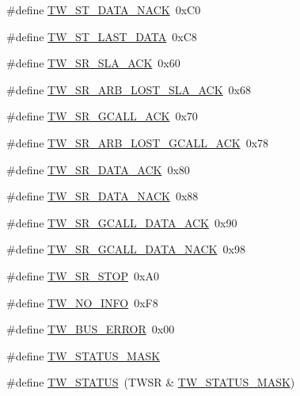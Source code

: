 \begin{DoxyCompactItemize}
\item 
\#define \hyperlink{group__util__twi_gacc1837317b1d45e9bb49b8e83cfe6d42}{T\+W\+\_\+\+S\+T\+\_\+\+D\+A\+T\+A\+\_\+\+N\+A\+CK}~0x\+C0
\item 
\#define \hyperlink{group__util__twi_gaf92d03d0051d47f5b9375f0ef9293d64}{T\+W\+\_\+\+S\+T\+\_\+\+L\+A\+S\+T\+\_\+\+D\+A\+TA}~0x\+C8
\item 
\#define \hyperlink{group__util__twi_ga9e9e761d674793772e6b3f77fc9d7fab}{T\+W\+\_\+\+S\+R\+\_\+\+S\+L\+A\+\_\+\+A\+CK}~0x60
\item 
\#define \hyperlink{group__util__twi_ga1c3ed5ed345d17972002b9fd07f4f829}{T\+W\+\_\+\+S\+R\+\_\+\+A\+R\+B\+\_\+\+L\+O\+S\+T\+\_\+\+S\+L\+A\+\_\+\+A\+CK}~0x68
\item 
\#define \hyperlink{group__util__twi_ga6eb3b4230887a8b73d7787ff231ea911}{T\+W\+\_\+\+S\+R\+\_\+\+G\+C\+A\+L\+L\+\_\+\+A\+CK}~0x70
\item 
\#define \hyperlink{group__util__twi_ga4756103341a65e0e3889996cdf15b2fa}{T\+W\+\_\+\+S\+R\+\_\+\+A\+R\+B\+\_\+\+L\+O\+S\+T\+\_\+\+G\+C\+A\+L\+L\+\_\+\+A\+CK}~0x78
\item 
\#define \hyperlink{group__util__twi_gac50f1a59c74c3109d4913dbecfb472c1}{T\+W\+\_\+\+S\+R\+\_\+\+D\+A\+T\+A\+\_\+\+A\+CK}~0x80
\item 
\#define \hyperlink{group__util__twi_ga6c0fa701fe9d96b0b7df29e8af154f94}{T\+W\+\_\+\+S\+R\+\_\+\+D\+A\+T\+A\+\_\+\+N\+A\+CK}~0x88
\item 
\#define \hyperlink{group__util__twi_ga4abaad098fd92bed63719ffb01802c8d}{T\+W\+\_\+\+S\+R\+\_\+\+G\+C\+A\+L\+L\+\_\+\+D\+A\+T\+A\+\_\+\+A\+CK}~0x90
\item 
\#define \hyperlink{group__util__twi_ga42234278f9b01b9af75dbbc617b97890}{T\+W\+\_\+\+S\+R\+\_\+\+G\+C\+A\+L\+L\+\_\+\+D\+A\+T\+A\+\_\+\+N\+A\+CK}~0x98
\item 
\#define \hyperlink{group__util__twi_ga98d2570f965790884cf1774e716ec629}{T\+W\+\_\+\+S\+R\+\_\+\+S\+T\+OP}~0x\+A0
\item 
\#define \hyperlink{group__util__twi_gabcff70642634cb53e9d8e93872f70c90}{T\+W\+\_\+\+N\+O\+\_\+\+I\+N\+FO}~0x\+F8
\item 
\#define \hyperlink{group__util__twi_ga90d373160b1d0a3f0c454af83c57df71}{T\+W\+\_\+\+B\+U\+S\+\_\+\+E\+R\+R\+OR}~0x00
\item 
\#define \hyperlink{group__util__twi_ga8d3aca0acc182f459a51797321728168}{T\+W\+\_\+\+S\+T\+A\+T\+U\+S\+\_\+\+M\+A\+SK}
\item 
\#define \hyperlink{group__util__twi_ga4440385d1818b4fe89b20341ea47b75a}{T\+W\+\_\+\+S\+T\+A\+T\+US}~(T\+W\+SR \& \hyperlink{group__util__twi_ga8d3aca0acc182f459a51797321728168}{T\+W\+\_\+\+S\+T\+A\+T\+U\+S\+\_\+\+M\+A\+SK})
\end{DoxyCompactItemize}

